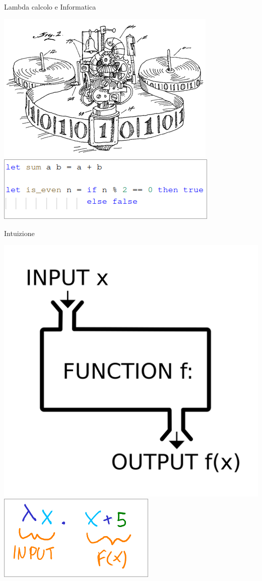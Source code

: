\documentclass{beamer}
\begin{document}
\begin{frame}{Lambda calcolo e Informatica}
\begin{center}
\includegraphics[scale=0.60]{3.png}
\includegraphics[scale=0.60]{4.png}
\end{center}
\end{frame}

\begin{frame}{Intuizione}
\begin{center}
\includegraphics[scale=0.15]{9.png}
\includegraphics[scale=0.7]{10.png}
\end{center}
\end{frame}
\end{document}
